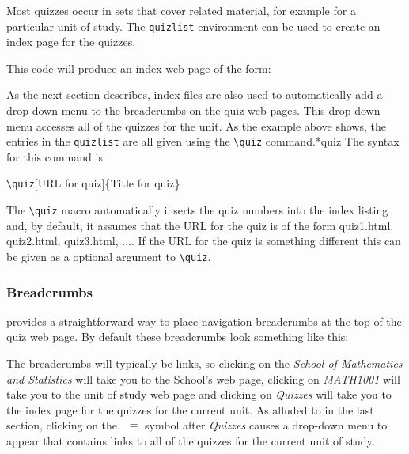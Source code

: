\documentclass[svgnames]{article}
\begin{document}
  Most quizzes occur in sets that cover related material, for example
  for a particular unit of study. The \Verb|quizlist| environment can be
  used to create an index page for the quizzes.

  

  This code will produce an index web page of the form:


  As the next section describes, index files are also used to
  automatically add a drop-down menu to the breadcrumbs on the quiz web
  pages. This drop-down menu accesses all of the quizzes for the unit.
  As the example above shows, the entries in the \Verb|quizlist| are all
  given using the \Verb|\quiz| command.*{quiz} The syntax for this command is

  \begin{center}
      \Verb|\quiz|[URL for quiz]\{Title for quiz\}
  \end{center}

  \noindent
  The \Verb|\quiz| macro automatically inserts the quiz numbers
  into the index listing and, by default, it assumes that the URL for the quiz
  is of the form \textsf{quiz1.html}, \textsf{quiz2.html},
  \textsf{quiz3.html}, .... If the URL for the quiz is something
  different this can be given as a optional argument to \Verb|\quiz|.

  \subsubsection{Breadcrumbs}\label{SS:breadcrumbs}

  \WebQuiz provides a straightforward way to place navigation breadcrumbs
  at the top of the quiz web page. By default these
  breadcrumbs look something like this:


  \noindent
  The breadcrumbs will typically be links, so clicking on the
  \textit{School of Mathematics and Statistics} will take you to the
  School's web page, clicking on \textit{MATH1001} will take you to the
  unit of study web page and clicking on \textit{Quizzes} will take you
  to the index page for the quizzes for the current unit. As alluded to
  in the last section, clicking on the~{\large\color{red} $\equiv$} symbol after
  \textit{Quizzes} causes a drop-down menu to appear that
  contains links to all of the quizzes for the current unit of study.
\end{document}
